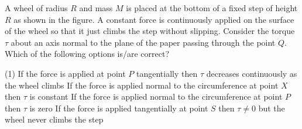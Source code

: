 
    \item A wheel of radius \( R \) and mass \( M \) is placed at the bottom of a fixed step of height \( R \) as shown in the figure. A constant force is continuously applied on the surface of the wheel so that it just climbs the step without slipping. Consider the torque \( \tau \) about an axis normal to the plane of the paper passing through the point \( Q \). Which of the following options is/are correct?
        \begin{tasks}(1)
            \task If the force is applied at point \( P \) tangentially then \( \tau \) decreases continuously as the wheel climbs
            \task If the force is applied normal to the circumference at point \( X \) then \( \tau \) is constant
            \task If the force is applied normal to the circumference at point \( P \) then \( \tau \) is zero
            \task If the force is applied tangentially at point \( S \) then \( \tau \neq 0 \) but the wheel never climbs the step
        \end{tasks}


\begin{center}
\end{center}